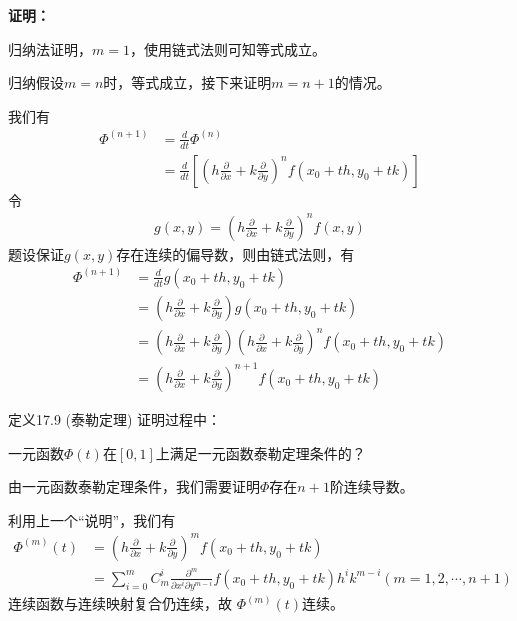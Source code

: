 \documentclass{article}
\begin{document}
\textbf{证明：}

归纳法证明，$m = 1$，使用链式法则可知等式成立。

归纳假设$m = n$时，等式成立，接下来证明$m = n + 1$的情况。

我们有
\begin{align*}
  \varPhi^{(n + 1)}
   & = \frac{d}{dt} \varPhi^{(n)}                                                                      \\
   & = \frac{d}{dt} \left[\left( h\frac{\partial}{\partial x} + k\frac{\partial}{\partial y} \right)^n
    f(x_0 + th, y_0 + tk)\right]
\end{align*}
令
\begin{align*}
  g(x, y) = \left( h\frac{\partial}{\partial x} + k\frac{\partial}{\partial y} \right)^n f(x, y)
\end{align*}
题设保证$g(x, y)$存在连续的偏导数，则由链式法则，有
\begin{align*}
  \varPhi^{(n + 1)}
   & = \frac{d}{dt} g(x_0 + th, y_0 + tk)                                                                                                                                            \\
   & = \left( h\frac{\partial}{\partial x} + k\frac{\partial}{\partial y} \right) g(x_0 + th, y_0 + tk)                                                                              \\
   & = \left( h\frac{\partial}{\partial x} + k\frac{\partial}{\partial y} \right) \left( h\frac{\partial}{\partial x} + k\frac{\partial}{\partial y} \right)^n f(x_0 + th, y_0 + tk) \\
   & = \left( h\frac{\partial}{\partial x} + k\frac{\partial}{\partial y} \right)^{n + 1} f(x_0 + th, y_0 + tk)
\end{align*}

\begin{zremark}
  定义17.9 (泰勒定理) 证明过程中：

  一元函数$\varPhi(t)$在$[0, 1]$上满足一元函数泰勒定理条件的？
\end{zremark}

由一元函数泰勒定理条件，我们需要证明$\varPhi$存在$n + 1$阶连续导数。

利用上一个“说明”，我们有
\begin{align*}
  \varPhi^{(m)}(t)
   & = (h \frac{\partial}{\partial x} + k \frac{\partial}{\partial y})^{m} f(x_0 + th, y_0 + tk)                                                       \\
   & = \sum\limits_{i = 0}^m C_{m}^i \frac{\partial^m}{\partial x^i \partial y^{m - i}} f(x_0 + th, y_0 + tk) h^i k^{m - i}  (m = 1, 2, \cdots, n + 1)
\end{align*}
连续函数与连续映射复合仍连续，故
$\varPhi^{(m)}(t)$连续。
\end{document}
